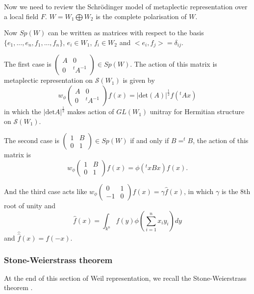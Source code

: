 \documentclass[12pt,a4paper,english]{article}
\theoremstyle{plain}
\theoremstyle{definition}
\begin{document}
Now we need to review the Schr\"odinger model of metaplectic representation over a local field $F$. $W=W_{1}\bigoplus W_{2}$ is the complete polarisation of $W$. 

Now $Sp(W)$ can be written as matrices with respect to the basis $\{e_{1},...,e_{n},f_{1},...,f_{n}\}$, $e_{i}\in W_{1}$, $f_{i}\in W_{2}$ and $<e_{i},f_{j}>=\delta_{ij}$.

The first case is 
$\begin{pmatrix}
A & 0\\
0 & ^{t}A^{-1}
\end{pmatrix}\in Sp(W)$. The action of this matrix is metaplectic representation on $\mathcal{S}(W_{1})$ is given by 
\begin{equation*}
    w_{\phi}
    \begin{pmatrix}
    A & 0\\
    0 & ^{t}A^{-1}
    \end{pmatrix}f(x)=|\text{det}(A)|^{\frac{1}{2}}f(^{t}Ax)
\end{equation*}
in which the $|\text{det}A|^{\frac{1}{2}}$ makes action of $GL(W_{1})$ unitray for Hermitian structure on $\mathcal{S}(W_{1})$.

The second case is $\begin{pmatrix}
1 & B\\
0& 1
\end{pmatrix}\in Sp(W)$ if and only if $B=^{t}B$, the action of this matrix is 
\begin{equation*}
    w_{\phi}\begin{pmatrix}
    1 & B\\
    0 &1
    \end{pmatrix}f(x)=\phi(^{t}xBx)f(x).
\end{equation*}

And the third case acts like $w_{\phi}\begin{pmatrix}
0 & 1 \\
-1 & 0
\end{pmatrix}f(x)=\gamma \hat{f}(x)$, in which $\gamma$ is the 8th root of unity and 
\begin{equation*}
    \hat{f}(x)=\int_{k^{n}} f(y)\phi(\sum^{n}_{i=1}x_{i}y_{i})dy
\end{equation*}
and $\hat{\hat{f}}(x)=f(-x)$.

\subsubsection{Stone-Weierstrass theorem}
At the end of this section of Weil representation, we recall the Stone-Weierstrass theorem \cite{repka1978stone}. 
\end{document}
